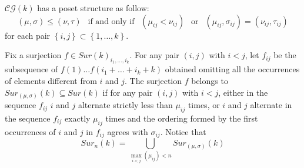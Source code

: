 \begin{definition}
	$\mathcal{CG}(k)$ has a poset structure as follow:
	\begin{equation*}
		(\mu,\sigma)\le (\nu,\tau) \ \ \text{ if and only if } \ \ (\mu_{ij}<\nu_{ij}) \ \ \text{ or } \ \ (\mu_{ij},\sigma_{ij})= (\nu_{ij},\tau_{ij})
	\end{equation*}
	for each pair $\left\lbrace i,j\right\rbrace \subset\left\lbrace 1,\dots,k  \right\rbrace $.
\end{definition}


	\begin{definition}
		Fix a surjection $f\in Sur(k)_{i_{1},\dots,i_{k}}$. For any pair $(i,j)$ with $i< j$, let $f_{ij}$ be the subsequence of $f(1) \dots f(i_1+\dots+i_k+k)$ obtained omitting all the occurrences of elements different from $i$ and $j$.
		The surjection $f$ belongs to $Sur_{(\mu,\sigma)}(k)\subseteq Sur(k)$ if for any pair $(i,j)$ with $i< j$, either in the sequence $f_{ij}$ $i$ and $j$ alternate strictly less than $\mu_{ij}$ times,
		 or $i$ and $j$ alternate in the sequence $f_{ij}$  exactly $\mu_{ij}$ times and the ordering formed by the first occurrences of $i$ and $j$ in $f_{ij}$ agrees with $\sigma_{ij}$. Notice that \begin{equation*}
		 	\label{def}
		 	Sur_{n}(k)=\bigcup_{\max_{i<j}(\mu_{ij})< n} Sur_{(\mu,\sigma)}(k)
		 \end{equation*}

	\end{definition}

